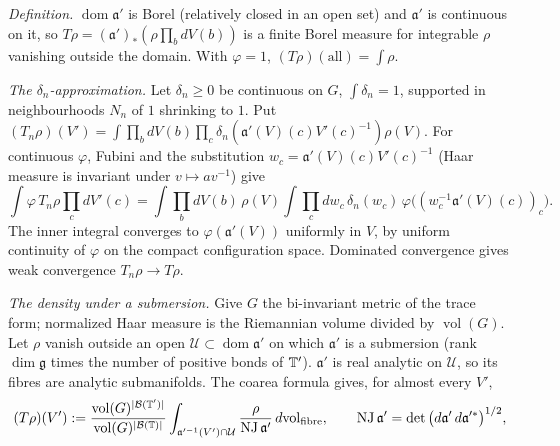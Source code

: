 \begin{detail}\label{d7:image}
\begin{step}
\emph{Definition.} $\operatorname{dom}\mathfrak a'$ is Borel (relatively closed in an open set) and $\mathfrak a'$ is continuous on it, so $T\rho=(\mathfrak a')_*(\rho\prod_bdV(b))$ is a finite Borel measure for integrable $\rho$ vanishing outside the domain. With $\varphi=1$, $(T\rho)(\text{all})=\int\rho$.
\end{step}
\begin{step}
\emph{The $\delta_n$-approximation.} Let $\delta_n\ge0$ be continuous on $G$, $\int\delta_n=1$, supported in neighbourhoods $N_n$ of $1$ shrinking to $1$. Put $(T_n\rho)(V')=\int\prod_bdV(b)\prod_c\delta_n(\mathfrak a'(V)(c)V'(c)^{-1})\rho(V)$. For continuous $\varphi$, Fubini and the substitution $w_c=\mathfrak a'(V)(c)V'(c)^{-1}$ (Haar measure is invariant under $v\mapsto av^{-1}$) give
\[
\int\varphi\,T_n\rho\prod_cdV'(c)=\int\prod_bdV(b)\,\rho(V)\int\prod_cdw_c\,\delta_n(w_c)\,\varphi\big((w_c^{-1}\mathfrak a'(V)(c))_c\big).
\]
The inner integral converges to $\varphi(\mathfrak a'(V))$ uniformly in $V$, by uniform continuity of $\varphi$ on the compact configuration space. Dominated convergence gives weak convergence $T_n\rho\to T\rho$.
\end{step}
\begin{step}
\emph{The density under a submersion.} Give $G$ the bi-invariant metric of the trace form; normalized Haar measure is the Riemannian volume divided by $\operatorname{vol}(G)$. Let $\rho$ vanish outside an open $\mathcal U\subset\operatorname{dom}\mathfrak a'$ on which $\mathfrak a'$ is a submersion (rank $\dim\mathfrak g$ times the number of positive bonds of $\mathbb T'$). $\mathfrak a'$ is real analytic on $\mathcal U$, so its fibres are analytic submanifolds. The coarea formula gives, for almost every $V'$,
\[
(T\rho)(V'):=\frac{\operatorname{vol}(G)^{|\mathcal B(\mathbb T')|}}{\operatorname{vol}(G)^{|\mathcal B(\mathbb T)|}}\int_{\mathfrak a'^{-1}(V')\cap\mathcal U}\frac{\rho}{\mathrm{NJ}\,\mathfrak a'}\,d\mathrm{vol}_{\rm fibre},\qquad\mathrm{NJ}\,\mathfrak a'=\det\big(d\mathfrak a'\,d\mathfrak a'^{*}\big)^{1/2},
\]

\end{step}
\end{detail}
